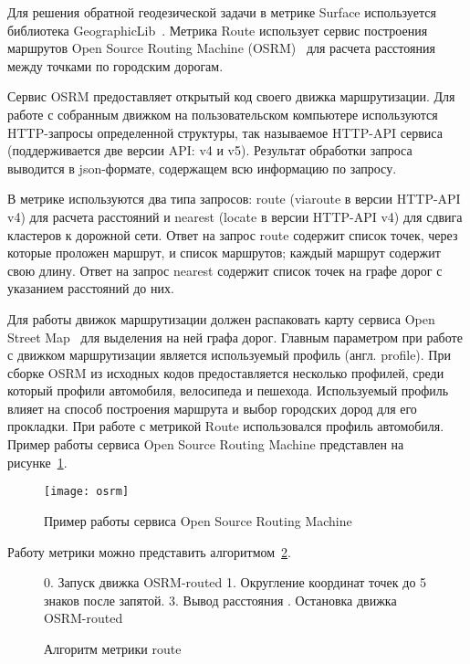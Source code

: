Для решения обратной геодезической задачи в метрике Surface используется библиотека GeographicLib~\cite{geographiclib}. Метрика Route использует сервис построения маршрутов Open Source Routing Machine (OSRM)~\cite{OSRM} для расчета расстояния между точками по городским дорогам.

Сервис OSRM предоставляет открытый код своего движка маршрутизации. Для работе с собранным движком на пользовательском компьютере используются HTTP-запросы определенной структуры, так называемое HTTP-API сервиса (поддерживается две версии API: v4 и v5). Результат обработки запроса выводится в json-формате, содержащем всю информацию по запросу.

В метрике используются два типа запросов: route (viaroute в версии HTTP-API v4) для расчета расстояний и nearest (locate в версии HTTP-API v4) для сдвига кластеров к дорожной сети. Ответ на запрос route содержит список точек, через которые проложен маршрут, и список маршрутов; каждый маршрут содержит свою длину. Ответ на запрос nearest содержит список точек на графе дорог с указанием расстояний до них.

Для работы движок маршрутизации должен распаковать карту сервиса Open Street Map~\cite{OSM} для выделения на ней графа дорог. Главным параметром при работе с движком маршрутизации является используемый профиль (англ. profile). При сборке OSRM из исходных кодов предоставляется несколько профилей, среди который профили автомобиля, велосипеда и пешехода. Используемый профиль влияет на способ построения маршрута и выбор городских дород для его прокладки. При работе с метрикой Route использовался профиль автомобиля. Пример работы сервиса Open Source Routing Machine представлен на рисунке~\ref{pic:osrm}.

\begin{figure}[ht!]
    \centering
    \texttt{[image: osrm]}\\[1ex]
    \parbox{.9\textwidth}{\caption{Пример работы сервиса Open Source Routing Machine~\cite{OSRM}}\label{pic:osrm}}
\end{figure}

Работу метрики можно представить алгоритмом~\ref{alg:route}.
\begin{figure}[ht!]
    \begin{algorithm}[H]
        0. Запуск движка OSRM-routed\;
        1. Округление координат точек до 5 знаков после запятой. 
        3. Вывод расстояния\;
        . Остановка движка OSRM-routed\;
    \end{algorithm}
    \vspace*{-1.5em}
    \caption{Алгоритм метрики route}
    \label{alg:route}
\end{figure}


